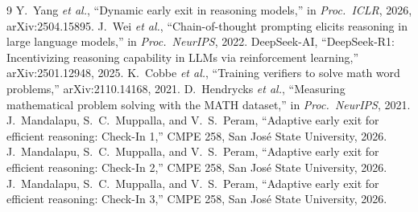 \documentclass[conference]{IEEEtran}
\begin{document}
\clearpage
\appendices


\clearpage
\begin{thebibliography}{9}
Y.~Yang \emph{et al.}, ``Dynamic early exit in reasoning models,'' in \emph{Proc.\ ICLR}, 2026, arXiv:2504.15895.
J.~Wei \emph{et al.}, ``Chain-of-thought prompting elicits reasoning in large language models,'' in \emph{Proc.\ NeurIPS}, 2022.
DeepSeek-AI, ``DeepSeek-R1: Incentivizing reasoning capability in LLMs via reinforcement learning,'' arXiv:2501.12948, 2025.
K.~Cobbe \emph{et al.}, ``Training verifiers to solve math word problems,'' arXiv:2110.14168, 2021.
D.~Hendrycks \emph{et al.}, ``Measuring mathematical problem solving with the MATH dataset,'' in \emph{Proc.\ NeurIPS}, 2021.
J.~Mandalapu, S.~C.~Muppalla, and V.~S.~Peram, ``Adaptive early exit for efficient reasoning: Check-In 1,'' CMPE 258, San Jos\'{e} State University, 2026.
J.~Mandalapu, S.~C.~Muppalla, and V.~S.~Peram, ``Adaptive early exit for efficient reasoning: Check-In 2,'' CMPE 258, San Jos\'{e} State University, 2026.
J.~Mandalapu, S.~C.~Muppalla, and V.~S.~Peram, ``Adaptive early exit for efficient reasoning: Check-In 3,'' CMPE 258, San Jos\'{e} State University, 2026.
\end{thebibliography}
\end{document}
